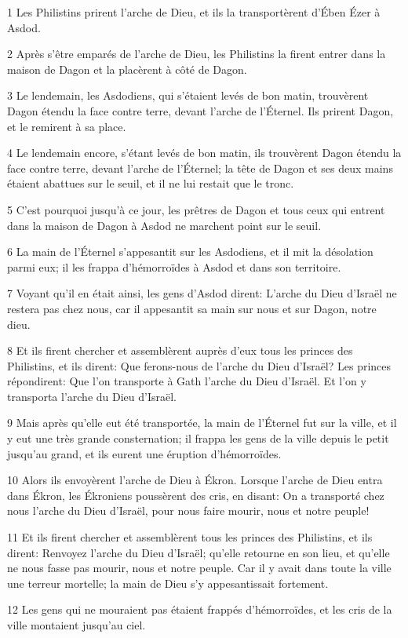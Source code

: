 \par 1 Les Philistins prirent l'arche de Dieu, et ils la transportèrent d'Ében Ézer à Asdod.
\par 2 Après s'être emparés de l'arche de Dieu, les Philistins la firent entrer dans la maison de Dagon et la placèrent à côté de Dagon.
\par 3 Le lendemain, les Asdodiens, qui s'étaient levés de bon matin, trouvèrent Dagon étendu la face contre terre, devant l'arche de l'Éternel. Ils prirent Dagon, et le remirent à sa place.
\par 4 Le lendemain encore, s'étant levés de bon matin, ils trouvèrent Dagon étendu la face contre terre, devant l'arche de l'Éternel; la tête de Dagon et ses deux mains étaient abattues sur le seuil, et il ne lui restait que le tronc.
\par 5 C'est pourquoi jusqu'à ce jour, les prêtres de Dagon et tous ceux qui entrent dans la maison de Dagon à Asdod ne marchent point sur le seuil.
\par 6 La main de l'Éternel s'appesantit sur les Asdodiens, et il mit la désolation parmi eux; il les frappa d'hémorroïdes à Asdod et dans son territoire.
\par 7 Voyant qu'il en était ainsi, les gens d'Asdod dirent: L'arche du Dieu d'Israël ne restera pas chez nous, car il appesantit sa main sur nous et sur Dagon, notre dieu.
\par 8 Et ils firent chercher et assemblèrent auprès d'eux tous les princes des Philistins, et ils dirent: Que ferons-nous de l'arche du Dieu d'Israël? Les princes répondirent: Que l'on transporte à Gath l'arche du Dieu d'Israël. Et l'on y transporta l'arche du Dieu d'Israël.
\par 9 Mais après qu'elle eut été transportée, la main de l'Éternel fut sur la ville, et il y eut une très grande consternation; il frappa les gens de la ville depuis le petit jusqu'au grand, et ils eurent une éruption d'hémorroïdes.
\par 10 Alors ils envoyèrent l'arche de Dieu à Ékron. Lorsque l'arche de Dieu entra dans Ékron, les Ékroniens poussèrent des cris, en disant: On a transporté chez nous l'arche du Dieu d'Israël, pour nous faire mourir, nous et notre peuple!
\par 11 Et ils firent chercher et assemblèrent tous les princes des Philistins, et ils dirent: Renvoyez l'arche du Dieu d'Israël; qu'elle retourne en son lieu, et qu'elle ne nous fasse pas mourir, nous et notre peuple. Car il y avait dans toute la ville une terreur mortelle; la main de Dieu s'y appesantissait fortement.
\par 12 Les gens qui ne mouraient pas étaient frappés d'hémorroïdes, et les cris de la ville montaient jusqu'au ciel.

